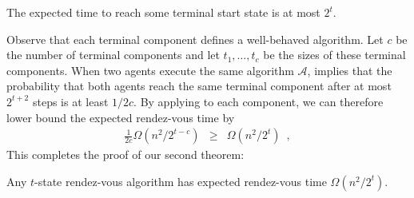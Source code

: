 \documentclass[lotsofwhite]{patmorin}
\begin{document}
\begin{lem}
The expected time to reach some terminal start state is at most $2^t$.
\end{lem}

Observe that each terminal component defines a well-behaved algorithm.
Let $c$ be the number of terminal components and let $t_1,\ldots,t_c$ be
the sizes of these terminal components.  When two agents execute the same
algorithm $\mathcal{A}$,  implies that the probability
that both agents reach the same terminal component after at most $2^{t+2}$
steps is at least $1/2c$.  By applying  to each component, we can therefore lower bound the expected rendez-vous time by
\begin{eqnarray*}
  \frac{1}{2c}\Omega(n^2/2^{t-c})
    & \ge & \Omega(n^2/2^t) \enspace ,
\end{eqnarray*}
This completes the proof of our second theorem:

\begin{thm}
Any $t$-state rendez-vous algorithm has expected rendez-vous time
$\Omega(n^2/2^t)$.
\end{thm}



\end{document}
